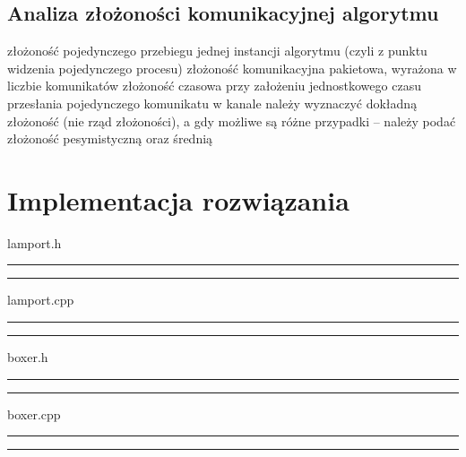 \documentclass{article}
\begin{document}
\subsection{Analiza złożoności komunikacyjnej algorytmu}
złożoność pojedynczego przebiegu jednej instancji algorytmu (czyli z punktu widzenia pojedynczego procesu) 
złożoność komunikacyjna pakietowa, wyrażona w liczbie komunikatów
złożoność czasowa przy założeniu jednostkowego czasu przesłania pojedynczego komunikatu w kanale
należy wyznaczyć dokładną złożoność (nie rząd złożoności), a gdy możliwe są różne przypadki – należy podać złożoność pesymistyczną oraz średnią

\section{Implementacja rozwiązania}
lamport.h
\hrule

\hrule
lamport.cpp
\hrule

\hrule
boxer.h
\hrule

\hrule
boxer.cpp
\hrule

\hrule
\end{document}
